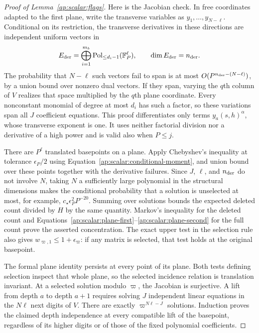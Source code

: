 \begin{proof}[Proof of Lemma~\ref{ap:scalar:flags}]
Here is the Jacobian check. In free coordinates adapted to the first
plane, write the transverse variables as $y_1,\ldots,y_{N-\ell}$.
Conditional on its restriction, the transverse derivatives in these
directions are independent uniform vectors in
\[
          E_{\rm der}=\bigoplus_{i=1}^{m_b}
                      \operatorname{Pol}_{\le d_i-1}(\mathbb F_P^\ell),
             \qquad \dim E_{\rm der}=n_{\rm der}.
\]
The probability that $N-\ell$ such vectors fail to span is at most
$O(P^{n_{\rm der}-(N-\ell)})$, by a union bound over nonzero dual
vectors. If they span, varying the $q$th column of $V$ realizes that
space multiplied by the $q$th plane coordinate. Every nonconstant
monomial of degree at most $d_i$ has such a factor, so these variations
span all $J$ coefficient equations. This proof differentiates only
terms $y_a(s,h)^\alpha$, whose transverse exponent is one. It uses
neither factorial division nor a derivative of a high power and is
valid also when $P\le j$.

There are $P^\ell$ translated basepoints on a plane. Apply Chebyshev's
inequality at tolerance $\epsilon_P/2$ using
Equation~\eqref{ap:scalar:conditional-moment}, and union bound over
these points together with the derivative failures. Since $J$, $\ell$,
and $n_{\rm der}$ do not involve $N$, taking $N$ a sufficiently large
polynomial in the structural dimensions makes the conditional
probability that a solution is unselected at most, for example,
$c_\star\epsilon_P^2P^{-20}$. Summing over solutions bounds the expected
deleted count divided by $H$ by the same quantity. Markov's inequality
for the deleted count and
Equations~\eqref{ap:scalar:plane-first}--\eqref{ap:scalar:plane-second}
for the full count prove the asserted concentration. The exact upper
test in the selection rule also gives $w_{\varpi,1}\le1+\epsilon_\varpi$:
if any matrix is selected, that test holds at the original basepoint.

The formal plane identity persists at every point of its plane.
Both tests defining selection inspect that whole plane, so the
selected incidence relation is translation invariant. At a selected
solution modulo $\varpi$, the Jacobian is surjective. A lift from
depth $a$ to depth $a+1$ requires solving $J$ independent linear
equations in the $N\ell$ next digits of $V$. There are exactly
$\varpi^{N\ell-J}$ solutions. Induction proves the claimed depth
independence at every compatible lift of the basepoint, regardless
of its higher digits or of those of the fixed polynomial coefficients.


\end{proof}
